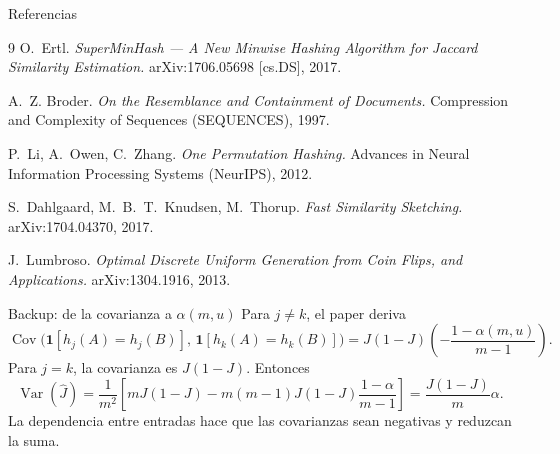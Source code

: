 \documentclass[aspectratio=169,11pt]{beamer}
\begin{document}
\begin{frame}[allowframebreaks]{Referencias}
  \footnotesize
  \begin{thebibliography}{9}
     O.~Ertl.
      \emph{SuperMinHash --- A New Minwise Hashing Algorithm for Jaccard
      Similarity Estimation.}
      arXiv:1706.05698 [cs.DS], 2017.

     A.~Z. Broder.
      \emph{On the Resemblance and Containment of Documents.}
      Compression and Complexity of Sequences (SEQUENCES), 1997.

     P.~Li, A.~Owen, C.~Zhang.
      \emph{One Permutation Hashing.}
      Advances in Neural Information Processing Systems (NeurIPS), 2012.

     S.~Dahlgaard, M.~B.~T.~Knudsen, M.~Thorup.
      \emph{Fast Similarity Sketching.}
      arXiv:1704.04370, 2017.

     J.~Lumbroso.
      \emph{Optimal Discrete Uniform Generation from Coin Flips, and
      Applications.}
      arXiv:1304.1916, 2013.
  \end{thebibliography}
\end{frame}

\appendix

\begin{frame}{Backup: de la covarianza a $\alpha(m,u)$}
  \small
  Para $j\ne k$, el paper deriva
  \[
    \operatorname{Cov}\bigl(\mathbf 1[h_j(A)=h_j(B)],\,
    \mathbf 1[h_k(A)=h_k(B)]\bigr)
    =J(1-J)\left(-\frac{1-\alpha(m,u)}{m-1}\right).
  \]
  Para $j=k$, la covarianza es $J(1-J)$. Entonces
  \[
    \operatorname{Var}(\widehat J)
    =\frac{1}{m^2}\left[mJ(1-J)-m(m-1)J(1-J)\frac{1-\alpha}{m-1}\right]
    =\frac{J(1-J)}{m}\alpha.
  \]
  La dependencia entre entradas hace que las covarianzas sean negativas y
  reduzcan la suma.
\end{frame}
\end{document}
